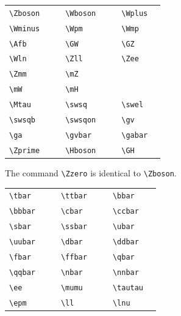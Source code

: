 \documentclass[11pt,a4paper]{atlasnote}
\begin{document}
\medskip

\begin{tabular}{llcllcll}
  \verb+\Zboson+ & \Zboson{} & \hspace{5mm} &
  \verb+\Wboson+ & \Wboson{} & \hspace{5mm} &
  \verb+\Wplus+ & \Wplus{} \\
  \verb+\Wminus+ & \Wminus{} & &
  \verb+\Wpm+ & \Wpm{} & &
  \verb+\Wmp+ & \Wmp{} \\
  \verb+\Afb+ & \Afb{} & &
  \verb+\GW+ & \GW{} & &
  \verb+\GZ+ & \GZ{} \\
  \verb+\Wln+ & \Wln{} & &
  \verb+\Zll+ & \Zll{} & &
  \verb+\Zee+ & \Zee{} \\
  \verb+\Zmm+ & \Zmm{} & &
  \verb+\mZ+ & \mZ{} \\
  \verb+\mW+ & \mW{} & &
  \verb+\mH+ & \mH{} \\
  \verb+\Mtau+ & \Mtau{} & &
  \verb+\swsq+ & \swsq{} & &
  \verb+\swel+ & \swel{} \\
  \verb+\swsqb+ &  \swsqb{} & &
  \verb+\swsqon+ & \swsqon{} & &
  \verb+\gv+ &  \gv{} \\
  \verb+\ga+ & \ga{} & &
  \verb+\gvbar+ & \gvbar{} & &
  \verb+\gabar+ & \gabar{} \\
  \verb+\Zprime+ & \Zprime{} & &
  \verb+\Hboson+ & \Hboson{} & & 
  \verb+\GH+ & \GH{} \\
\end{tabular}

\medskip

\noindent The command \verb+\Zzero+ is identical to \verb+\Zboson+.

\medskip

\begin{tabular}{llcllcll}
  \verb+\tbar+ & \tbar{} & \hspace{1cm} &
  \verb+\ttbar+ & \ttbar{} & \hspace{1cm} &
  \verb+\bbar+ & \bbar{} \\
  \verb+\bbbar+ & \bbbar{} & &
  \verb+\cbar+ & \cbar{} & &
  \verb+\ccbar+ & \ccbar{} \\
  \verb+\sbar+ & \sbar{} & &
  \verb+\ssbar+ &  \ssbar{} & &
  \verb+\ubar+ & \ubar{} \\
  \verb+\uubar+ & \uubar{} & &
  \verb+\dbar+ & \dbar{} & &
  \verb+\ddbar+ & \ddbar{} \\
  \verb+\fbar+ & \fbar{} & &
  \verb+\ffbar+ &  \ffbar{} & &
  \verb+\qbar+ & \qbar{} \\
  \verb+\qqbar+ & \qqbar{} & &
  \verb+\nbar+ & \nbar{} & &
  \verb+\nnbar+ & \nnbar{} \\
  \verb+\ee+ & \ee{} & &
  \verb+\mumu+ & \mumu{} & &
  \verb+\tautau+ & \tautau{} \\
  \verb+\epm+ & \epm{} & &
  \verb+\ll+ & \ll{} & & 
  \verb+\lnu+ & \lnu{} \\
\end{tabular}
\end{document}
